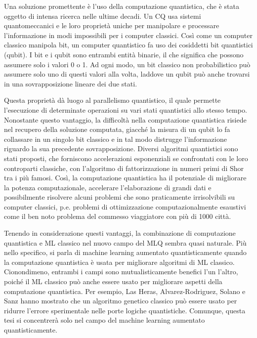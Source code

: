 Una soluzione promettente è l'uso della computazione quantistica, che è stata 
oggetto di intensa ricerca nelle ultime decadi. Un \ac{CQ} usa 
sistemi quantomeccanici e le loro proprietà uniche per manipolare e processare 
l'informazione in modi impossibili per i computer classici. 
Così come un computer classico manipola bit, un computer quantistico fa uso dei 
cosiddetti bit quantistici (qubit). I bit e i qubit sono entrambi entità binarie, 
il che significa che possono assumere solo i valori 0 o 1. Ad ogni modo, un bit 
classico non probabilistico può assumere solo uno di questi valori alla volta, 
laddove un qubit può anche trovarsi in una sovrapposizione lineare dei due stati. 

Questa proprietà dà luogo al parallelismo quantistico, il quale permette l'esecuzione 
di determinate operazioni su vari stati quantistici allo stesso tempo. 
Nonostante questo vantaggio, la difficoltà nella computazione quantistica risiede 
nel recupero della soluzione computata, giacché la misura di un qubit lo fa 
collassare in un singolo bit classico e in tal modo distrugge l'informazione riguardo 
la sua precedente sovrapposizione. Diversi algoritmi quantistici sono stati proposti, 
che forniscono accelerazioni esponenziali se confrontati con le loro controparti classiche, 
con l'algoritmo di fattorizzazione in numeri primi di Shor tra i più famosi. %
Così, la computazione quantistica ha il potenziale di migliorare la potenza computazionale, 
accelerare l'elaborazione di grandi dati e possibilmente risolvere alcuni problemi che sono 
praticamente irrisolvibili su computer classici, p.e. problemi di ottimizzazione 
computazionalmente esaustivi come il ben noto problema del commesso viaggiatore con più 
di 1000 città. %

Tenendo in considerazione questi vantaggi, la combinazione di computazione quantistica e \ac{ML}
classico nel nuovo campo del \ac{MLQ} sembra quasi naturale. Più nello specifico, si parla di 
machine learning aumentato quantisticamente quando la computazione quantistica è usata per 
migliorare algoritmi di \ac{ML} classico. Cionondimeno, entrambi i campi sono mutualisticamente 
benefici l'un l'altro, poiché il \ac{ML} classico può anche essere usato per migliorare aspetti 
della computazione quantistica. Per esempio, Las Heras, Alvarez-Rodriguez, Solano e Sanz %
hanno mostrato che un algoritmo genetico classico può essere usato per ridurre l'errore sperimentale 
nelle porte logiche quantistiche. Comunque, questa tesi si concentrerà solo nel campo del machine 
learning aumentato quantisticamente. 

